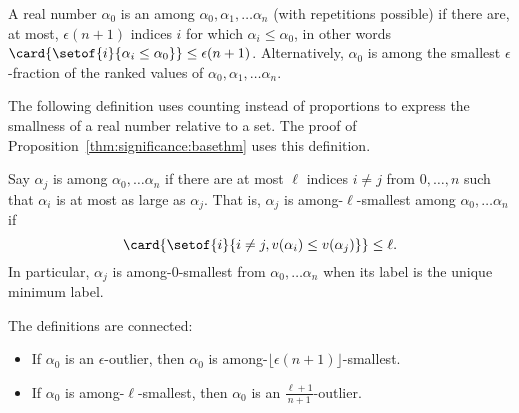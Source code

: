 \documentclass[12pt]{article}
\begin{document}
\begin{definition}
    A real number \( \alpha_0 \) is an %
    among \( \alpha_0, \alpha_1, \dots \alpha_n \) (with repetitions
    possible) if there are, at most, \( \epsilon(n + 1) \) indices \( i \)
    for which \( \alpha_i \le \alpha_0 \), in other words \( \card{%
    \setof{i}{\alpha_i \le \alpha_0}} \le \epsilon(n+1) \).
    Alternatively, \( \alpha_0 \) is among the smallest \( \epsilon \)-fraction
    of the ranked values of \( \alpha_0, \alpha_1, \dots \alpha_n \).
\end{definition}

The following definition uses counting instead of proportions to express
the smallness of a real number relative to a set.  The proof of 
Proposition~\ref{thm:significance:basethm}  uses this definition.

\begin{definition}
    Say \( \alpha_j \) is %
    among \( \alpha_0, \dots \alpha_n \) if there are at most \( \ell \)
    indices \( i \ne j \) from \( 0, \dots, n \) such that  \(
    \alpha_i \) is at most as large as \( \alpha_j \).  That is, \(
    \alpha_j \) is among-\( \ell \)-smallest among \( \alpha_0, \dots
    \alpha_n \) if
    \[
      \card{ \setof{i}{i \ne j, v(\alpha_i) \le v(\alpha_j)}}
      \le \ell.
    \]  In particular, \( \alpha_j \) is among-\( 0 \)-smallest
    from \( \alpha_0, \dots \alpha_n \) when its label is the unique
    minimum label.
\end{definition}

\begin{remark}
    The definitions are connected:
    \begin{itemize}
        \item
            If \( \alpha_0 \) is an \( \epsilon \)-outlier, then \(
            \alpha_0 \) is among-\( \lfloor \epsilon (n+1) \rfloor \)-smallest.
        \item
            If \( \alpha_0 \) is among-\( \ell \)-smallest, then \(
            \alpha_0 \) is an \( \frac{\ell + 1}{n+1} \)-outlier.
    \end{itemize}
\end{remark}
\end{document}
